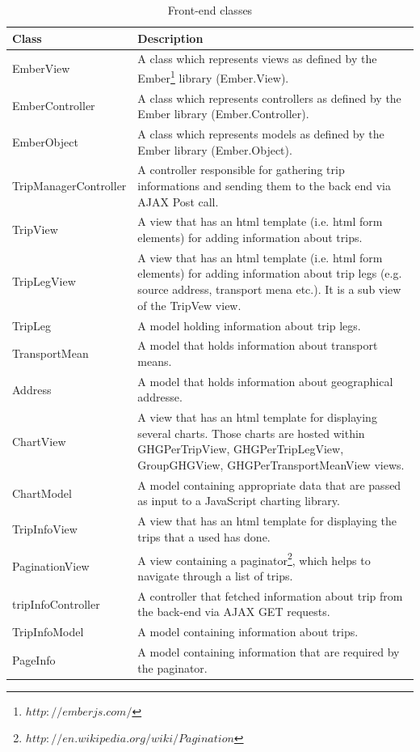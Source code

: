 \begin{table}
  \centering
  \begin{tabular}{|p{150px}|p{250px}|}
    \hline
    Class  & Description\\
    \hline
    EmberView & A class which represents views as defined by the Ember\footnote{$http://emberjs.com/$} library (Ember.View). \\
    EmberController & A class which represents controllers as defined by the Ember library (Ember.Controller). \\
    EmberObject & A class which represents models as defined by the Ember library (Ember.Object). \\
    TripManagerController & A controller responsible for gathering trip informations and sending them to the back end via AJAX Post call. \\
    TripView & A view that has an html template (i.e. html form elements) for adding information about trips. \\
    TripLegView & A view that has an html template (i.e. html form elements) for adding information about trip legs (e.g. source address, transport mena etc.). It is a sub view of the TripVew view. \\
    TripLeg & A model holding information about trip legs. \\
    TransportMean & A model that holds information about transport means. \\
    Address & A model that holds information about geographical addresse. \\
    ChartView & A view that has an html template for displaying several charts. Those charts are hosted within GHGPerTripView, GHGPerTripLegView, GroupGHGView, GHGPerTransportMeanView views. \\
    ChartModel & A model containing appropriate data that are passed as input to a JavaScript charting library. \\
    TripInfoView & A view that has an html template for displaying the trips that a used has done. \\
    PaginationView & A view containing a paginator\footnote{$http://en.wikipedia.org/wiki/Pagination$}, which helps to navigate through a list of trips. \\
    tripInfoController & A controller that fetched information about trip from the back-end via AJAX GET requests. \\
    TripInfoModel & A model containing information about trips. \\
    PageInfo & A model containing information that are required by the paginator. \\
    \hline
  \end{tabular}
  \caption{Front-end classes}\label{frontEndClasses}
\end{table}


